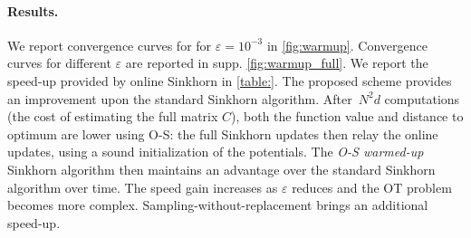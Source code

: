 \paragraph{Results.} We report convergence curves for for $\varepsilon =
10^{-3}$ in \autoref{fig:warmup}. Convergence curves for different
$\varepsilon$ are reported in supp. \autoref{fig:warmup_full}. We report the speed-up
provided by online Sinkhorn in \autoref{table:}. The proposed scheme provides an
improvement upon the standard Sinkhorn algorithm. After $N^2 d$ computations
(the cost of estimating the full matrix $C$), both the function value and
distance to optimum are lower using O-S: the full Sinkhorn updates then
relay the online updates, using a sound initialization of the potentials. The
\textit{O-S warmed-up} Sinkhorn algorithm then maintains an advantage over the
standard Sinkhorn algorithm over time. The speed gain increases
as $\varepsilon$ reduces and the OT problem becomes more complex. Sampling-without-replacement brings an additional speed-up.
